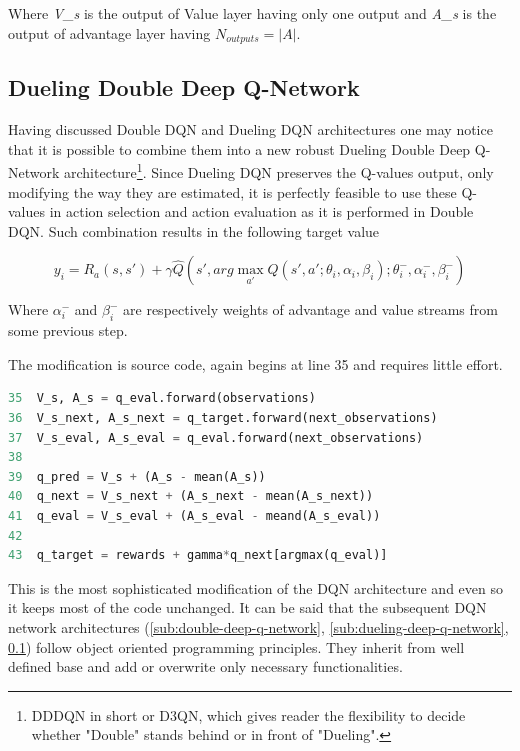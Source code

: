 Where \emph{V\_s} is the output of Value layer having only one output and \emph{A\_s} is the output of advantage layer having $N_{outputs}= |A|$.

\subsection{Dueling Double Deep Q-Network}
\label{sub:dueling-double-deep-q-network}

Having discussed Double DQN and Dueling DQN architectures one may notice that it is possible to combine them into a new robust Dueling
Double Deep Q-Network architecture\footnote{DDDQN in short or D3QN, which gives reader the flexibility to decide whether "Double" stands
behind or in front of "Dueling".}. Since Dueling DQN preserves the Q-values output, only modifying the way they are estimated, it is
perfectly feasible to use these Q-values in action selection and action evaluation as it is performed in Double DQN. Such combination
results in the following target value

\begin{equation}
    y_i = R_a(s, s') + \gamma \hat{Q}(s', arg\max_{a'}Q(s', a'; \theta_i, \alpha_i, \beta_i); \theta^-_i, \alpha^-_i, \beta^-_i)
\label{eq:dueling-double-dqn-target-value}
\end{equation}

Where $\alpha^-_i$ and $\beta^-_i$ are respectively weights of advantage and value streams from some previous step.

The modification is source code, again begins at line 35 and requires little effort.

\begin{lstlisting}[language=Python, caption={Dueling Double Deep Q-learning modification}]
35  V_s, A_s = q_eval.forward(observations)
36  V_s_next, A_s_next = q_target.forward(next_observations)
37  V_s_eval, A_s_eval = q_eval.forward(next_observations)
38    
39  q_pred = V_s + (A_s - mean(A_s))
40  q_next = V_s_next + (A_s_next - mean(A_s_next))
41  q_eval = V_s_eval + (A_s_eval - meand(A_s_eval))
42    
43  q_target = rewards + gamma*q_next[argmax(q_eval)]
\end{lstlisting}

This is the most sophisticated modification of the DQN architecture and even so it keeps most of the code unchanged. It can be said that
the subsequent DQN network architectures (\ref{sub:double-deep-q-network}, \ref{sub:dueling-deep-q-network},
\ref{sub:dueling-double-deep-q-network}) follow object oriented programming principles. They inherit from well defined base and add or
overwrite only necessary functionalities.

